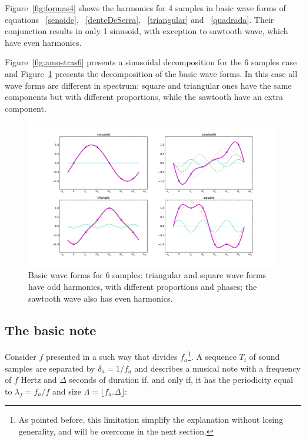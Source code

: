 \documentclass[
 aip,
 jmp,
 amsmath,amssymb,
 reprint,
]{revtex4-1}
\begin{document}
Figure~\ref{fig:formas4} shows the harmonics for 4 samples in basic wave forms of equations ~\ref{senoide}, ~\ref{denteDeSerra}, ~\ref{triangular} and ~\ref{quadrada}. Their conjunction results in only 1 sinusoid, with exception to sawtooth wave, which have even harmonics.

Figure~\ref{fig:amostras6} presents a sinusoidal decomposition for the 6 samples case and Figure~\ref{fig:formas6} presents the decomposition of the basic wave forms.
In this case all wave forms are different in spectrum: square and triangular ones have the same components but with different proportions, while the sawtooth have an extra component.

\begin{figure}[h!]
    \centering
        \includegraphics[width=\columnwidth]{figures/amostras6formas__}
    \caption{Basic wave forms for 6 samples: triangular and square wave forms have odd harmonics, with different proportions and phases; the sawtooth wave also has even harmonics.}
        \label{fig:formas6}
\end{figure}

\subsection{The basic note}\label{notaBasica}

Consider $f$ presented in a such way that divides $f_a$\footnote{As pointed before, this limitation simplify the explanation without losing generality, and will be overcome in the next section.}. A sequence $T_i$ of sound samples are separated by $\delta_a=1/f_a$ and describes a musical note with a frequency of $f$ Hertz and $\Delta$ seconds of duration if, and only if, it has the periodicity equal to $\lambda_f=f_a/f$ and size $\Lambda=\lfloor f_a . \Delta \rfloor $:
\end{document}
